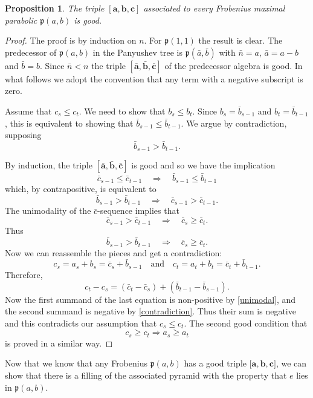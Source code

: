 \documentclass{amsart}
\def\ba{\mathbf{a}}
\def\bb{\mathbf{b}}
\def\bc{\mathbf{c}}
\def\fp{\mathfrak p} %
\newcommand{\pab}[1][a,b]{\fp(#1)}
\newtheorem{proposition}[theorem]{Proposition}
\theoremstyle{definition}
\begin{document}
\begin{proposition}
\label{prop:good-triple}
The triple $[\ba, \bb, \bc]$ associated to every
Frobenius maximal parabolic $\pab$ is good.
\end{proposition}

\begin{proof}
The proof is by induction on $n$. For $\mathfrak{p}(1,1)$ the result is clear. The predecessor of $\pab$ in the Panyushev tree is $\mathfrak{p}(\bar a, \bar b)$ with $\bar n =a$, $\bar a = a-b$ and $\bar b =b$. Since $\bar n<n$ the triple $[\bar{\ba},\bar{\bb},\bar{\bc}]$ of the predecessor algebra is good. In what follows we adopt the convention that any term with a negative subscript is zero. 

Assume that $c_s\leq c_{t}$. We need to show that $b_s\leq b_{t}$. Since $b_s=\bar{b}_{s-1}$ and $b_{t}=\bar{b}_{t-1}$, this is equivalent to showing that $\bar{b}_{s-1}\leq \bar{b}_{t-1}$. We argue by contradiction, supposing
\begin{equation}\label{contradiction}
    \bar{b}_{s-1}>\bar{b}_{t-1}.
\end{equation}
	
By induction, the triple $[\bar{\ba},\bar{\bb},\bar{\bc}]$ is good and so we have the implication
\[
    \bar{c}_{s-1}\leq \bar{c}_{t-1}\quad \Longrightarrow \quad \bar{b}_{s-1} \leq \bar{b}_{t-1}
\]
which, by contrapositive, is equivalent to
\[\bar{b}_{s-1}>\bar{b}_{t-1}\quad \Longrightarrow \quad\bar{c}_{s-1}>\bar{c}_{t-1}.\]
The unimodality of the $\bar{c}$-sequence implies that
\[\bar{c}_{s-1}>\bar{c}_{t-1} \quad \Longrightarrow \quad \bar{c}_s\geq \bar{c}_{t}.\]
Thus 
\begin{equation}\label{unimodal}\bar{b}_{s-1}>\bar{b}_{t-1}\quad \Longrightarrow \quad \bar{c}_s\geq \bar{c}_{t}.\end{equation}
Now we can reassemble the pieces and get a contradiction:
\[c_s = a_s+b_s= \bar{c}_s+\bar{b}_{s-1}\quad \text{and}\quad c_{t} = a_{t}+b_{t}= \bar{c}_{t}+\bar{b}_{t-1}.\]
Therefore,
\[c_{t}-c_{s}=\left(\bar{c}_{t}-\bar{c}_s\right) + \left(\bar{b}_{t-1} -\bar{b}_{s-1}\right).\]
Now the first summand of the last equation is non-positive by \eqref{unimodal}, and the second summand is negative by \eqref{contradiction}. Thus their sum is negative and this contradicts our assumption that $c_s\leq c_{t}.$ 
The second good condition that 
\[c_s\geq c_{t} \Rightarrow a_s\geq a_{t}\]
is proved in a similar way.
\end{proof}

Now that we know that any Frobenius $\pab$ has a good triple ${[\ba, \bb, \bc}]$, we can show that there is a filling of the associated pyramid with the property that $e$ lies in $\pab$.
\end{document}
